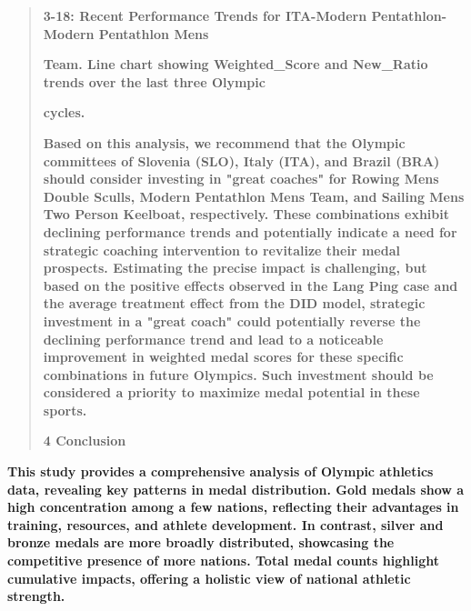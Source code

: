 \documentclass[12pt,a4paper]{article}
\renewenvironment{quote}{\begin{quotation}}{\end{quotation}}  %
\begin{document}
    \begin{quote}
    \textbf{3-18: Recent Performance Trends for ITA-Modern Pentathlon-Modern
    Pentathlon Men\textquotesingle s}
    
    \textbf{Team. Line chart showing Weighted\_Score and New\_Ratio trends
    over the last three Olympic}
    
    \textbf{cycles.}
    
    \textbf{Based on this analysis, we recommend that the Olympic committees
    of Slovenia (SLO), Italy (ITA), and Brazil (BRA) should consider
    investing in "great coaches" for Rowing Men\textquotesingle s Double
    Sculls, Modern Pentathlon Men\textquotesingle s Team, and Sailing
    Men\textquotesingle s Two Person Keelboat, respectively. These
    combinations exhibit declining performance trends and potentially
    indicate a need for strategic coaching intervention to revitalize their
    medal prospects. Estimating the precise impact is challenging, but based
    on the positive effects observed in the Lang Ping case and the average
    treatment effect from the DID model, strategic investment in a "great
    coach" could potentially reverse the declining performance trend and
    lead to a noticeable improvement in weighted medal scores for these
    specific combinations in future Olympics. Such investment should be
    considered a priority to maximize medal potential in these sports.}
    
    \protect{}\label{bookmark22-1}{}\textbf{4 Conclusion}
    \end{quote}
    
    \textbf{This study provides a comprehensive analysis of Olympic
    athletics data, revealing key patterns in medal distribution. Gold
    medals show a high concentration among a few nations, reflecting their
    advantages in training, resources, and athlete development. In contrast,
    silver and bronze medals are more broadly distributed, showcasing the
    competitive presence of more nations. Total medal counts highlight
    cumulative impacts, offering a holistic view of national athletic
    strength.}
    
\end{document}
